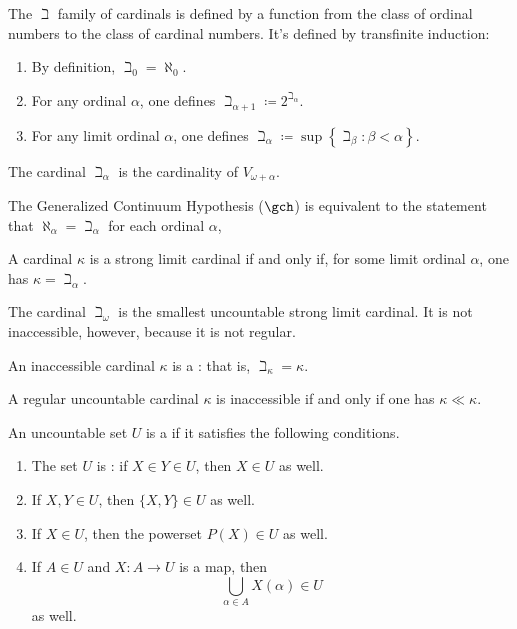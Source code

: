 \begin{eg}
	The $\beth$ family of cardinals is defined by a function from the class of ordinal numbers to the class of cardinal numbers.
	It's defined by transfinite induction:
	\begin{enumerate}
		\item By definition, $ \beth_0 = \aleph_0 $.
		\item For any ordinal $ \alpha $, one defines $ \beth_{\alpha+1} \coloneq 2^{\beth_{\alpha}} $.
		\item For any limit ordinal $ \alpha $,
			one defines $ \beth_{\alpha} \coloneq \sup \left\{ \beth_{\beta} : \beta < \alpha \right\} $.
	\end{enumerate}
	The cardinal $ \beth_{\alpha} $ is the cardinality of $ V_{\omega+\alpha} $.

	The Generalized Continuum Hypothesis ($ \gch $) is equivalent to the statement that
	$ \aleph_{\alpha} = \beth_{\alpha} $ for each ordinal $ \alpha $,	
	
	A cardinal $ \kappa $ is a strong limit cardinal if and only if,
	for some limit ordinal $ \alpha $, one has $ \kappa = \beth_{\alpha} $.

	The cardinal $ \beth_{\omega} $ is
	the smallest uncountable strong limit cardinal.
	It is not inaccessible, however,
	because it is not regular.

	An inaccessible cardinal $ \kappa $ is
	a :
	that is, $ \beth_{\kappa} = \kappa $.
\end{eg}

\begin{nul}
	A regular uncountable cardinal $ \kappa $
	is inaccessible if and only if
	one has $ \kappa \ll \kappa $.
\end{nul}

\begin{definition}%
\label{dfn:uni}
	An uncountable set $ U $ is a  if it satisfies the following conditions.
	\begin{enumerate}
		\item The set $ U $ is :
			if $ X \in Y \in U $, then $ X \in U $ as well.
		\item If $ X, Y \in U $, then $ \{X,Y\} \in U $ as well.
		\item If $ X \in U $, then the powerset $ P(X) \in U $ as well.
		\item If $ A \in U $ and $ X \colon A \to U $ is a map, then
		\[
			\bigcup_{\alpha\in A}X(\alpha) \in U
		\]
		as well.
	\end{enumerate}
\end{definition}

